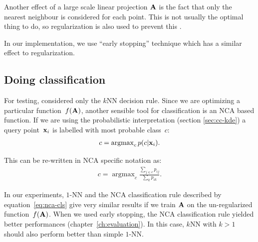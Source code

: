   Another effect of a large scale linear projection $\mathbf{A}$ is the fact that only the nearest neighbour is considered for each point. This is not usually the optimal thing to do, so regularization is also used to prevent this \citep{singh2010}.

  In our implementation, we use ``early stopping'' technique which has a similar effect to regularization. 

%         

\subsection{Doing classification}
\label{subsec:doing-classification}

  For testing, \citet{goldberger2004} considered only the $k$NN decision rule. Since we are optimizing a particular function~$f(\mathbf{A})$, another sensible tool for classification is an NCA based function. If we are using the probabilistic interpretation (section \ref{sec:cc-kde}) a query point~$\mathbf{x}_i$ is labelled with most probable class~$c$:
  \begin{align}
     c = \operatorname{argmax}_cp(c|\mathbf{x}_i).
    \label{eq:nca-cls-1}
  \end{align}

  This can be re-written in NCA specific notation as:
  \begin{align}
    c = \operatorname{argmax}_c\frac{\sum_{j\in c}p_{ij}}{\sum_k p_{ik}}.
    \label{eq:nca-cls}
  \end{align}

  In our experiments, $1$-NN and the NCA classification rule described by equation~\eqref{eq:nca-cls} give very similar results if we train $\mathbf{A}$ on the un-regularized function~$f(\mathbf{A})$. When we used early stopping, the NCA classification rule yielded better performances (chapter~\ref{ch:evaluation}). In this case, $k$NN with $k>1$ should also perform better than simple $1$-NN.

